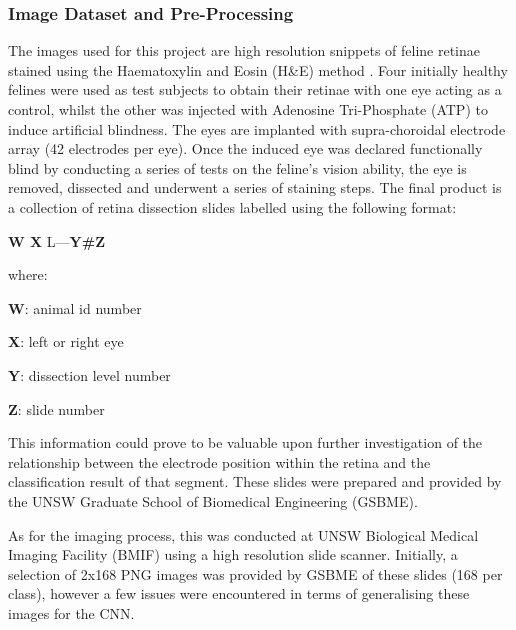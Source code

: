 \documentclass[a4paper]{article}
\begin{document}
        \subsubsection{Image Dataset and Pre-Processing}
            The images used for this project are high resolution snippets of feline retinae stained using the Haematoxylin and Eosin (H\&E) method \cite{RN23}. Four initially healthy felines were used as test subjects to obtain their retinae with one eye acting as a control, whilst the other was injected with Adenosine Tri-Phosphate (ATP) to induce artificial blindness. The eyes are implanted with supra-choroidal electrode array (42 electrodes per eye). Once the induced eye was declared functionally blind by conducting a series of tests on the feline's vision ability, the eye is removed, dissected and underwent a series of staining steps. The final product is a collection of retina dissection slides labelled using the following format:
            \begin{center}
                \large{\textbf{W X} L—\textbf{Y\#Z}}
            \end{center}
            where:
            \vspace{3mm}

            \textbf{W}: animal id number 
            
            \vspace{3mm}

            \textbf{X}: left or right eye 
            
            \vspace{3mm}
            
            \textbf{Y}: dissection level number 
            
            \vspace{3mm}
            
            \textbf{Z}: slide number

            \vspace{3mm}

            This information could prove to be valuable upon further investigation of the relationship between the electrode position within the retina and the classification result of that segment. These slides were prepared and provided by the UNSW Graduate School of Biomedical Engineering (GSBME).
            \vspace{3mm}

            As for the imaging process, this was conducted at UNSW Biological Medical Imaging Facility (BMIF) using a high resolution slide scanner. Initially, a selection of 2x168 PNG images was provided by GSBME of these slides (168 per class), however a few issues were encountered in terms of generalising these images for the CNN.
            \vspace{3mm}
\end{document}
